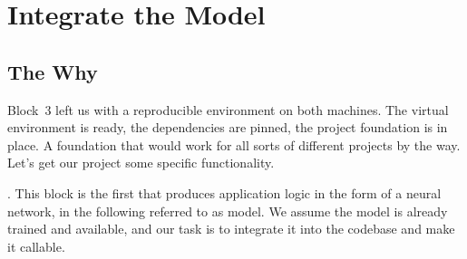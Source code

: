 

\chapter{Integrate the Model}


\section{The Why}

Block~3 left us with a reproducible environment on both machines.
The virtual environment is ready, the dependencies are pinned,
the project foundation is in place. A foundation that would work for all sorts of different projects by the way.
Let's get our project some specific functionality.


.
This block is the first that produces application logic in the form of a neural network,
in the following referred to as model. 
We assume the model is already trained and available, 
and our task is to integrate it into the codebase and make it callable.

